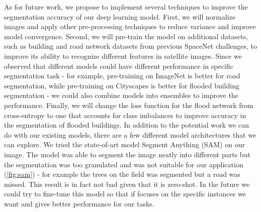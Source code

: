 \documentclass[10pt,twocolumn,letterpaper]{article}
\begin{document}
As for future work, we propose to implement several techniques to improve the segmentation accuracy of our deep learning model. First, we will normalize images and apply other pre-processing techniques to reduce variance and improve model convergence. Second, we will pre-train the model on additional datasets, such as building and road network datasets from previous SpaceNet challenges, to improve its ability to recognize different features in satellite images. Since we observed that different models could have different performance in specific segmentation task - for example, pre-training on ImageNet is better for road segmentation, while pre-training on Cityscapes is better for flooded building segmentation - we could also combine models into ensembles to improve the performance. Finally, we will change the loss function for the flood network from cross-entropy to one that accounts for class imbalances to improve accuracy in the segmentation of flooded buildings. 
In addition to the potential work we can do with our existing models, there are a few different model architectures that we can explore. We tried the state-of-art model Segment Anything (SAM) on our image. The model was able to segment the image neatly into different parts but the segmentation was too granulated and was not suitable for our application (\ref{fig:sam}) - for example the trees on the field was segmented but a road was missed. This result is in fact not bad given that it is zero-shot. In the future we could try to fine-tune this model so that if focuses on the specific instances we want and gives better performance for our tasks. 
\end{document}

